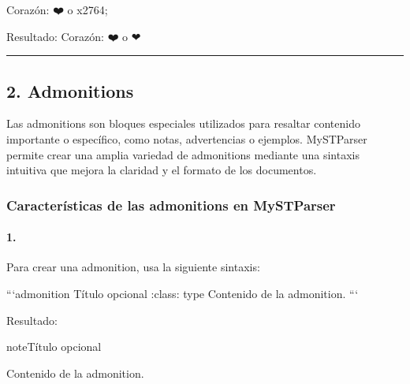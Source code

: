 \documentclass[a4paper,10pt,oneside,spanish,openany]{sphinxmanual}
\begin{document}
\begin{sphinxVerbatim}[commandchars=\\\{\}]
Corazón: ❤️ o \PYGZam{}\PYGZsh{}x2764;
\end{sphinxVerbatim}

\sphinxAtStartPar
Resultado: Corazón: ❤️ o ❤


\bigskip\hrule\bigskip



\subsection{2. Admonitions}
\label{\detokenize{configuracion_inicial/013.guia_de_myst_parser:admonitions}}
\sphinxAtStartPar
Las admonitions son bloques especiales utilizados para resaltar contenido importante o específico, como notas, advertencias o ejemplos. MyST\sphinxhyphen{}Parser permite crear una amplia variedad de admonitions mediante una sintaxis intuitiva que mejora la claridad y el formato de los documentos.


\subsubsection{Características de las admonitions en MyST\sphinxhyphen{}Parser}
\label{\detokenize{configuracion_inicial/013.guia_de_myst_parser:caracteristicas-de-las-admonitions-en-myst-parser}}

\paragraph{1. }
\label{\detokenize{configuracion_inicial/013.guia_de_myst_parser:sintaxis-basica}}
\sphinxAtStartPar
Para crear una admonition, usa la siguiente sintaxis:

\begin{sphinxVerbatim}[commandchars=\\\{\}]
    ```\PYGZob{}admonition\PYGZcb{} Título opcional :class: type Contenido de la admonition. ```
\end{sphinxVerbatim}

\sphinxAtStartPar
Resultado:

\begin{sphinxadmonition}{note}{Título opcional}

\sphinxAtStartPar
Contenido de la admonition.
\end{sphinxadmonition}
\end{document}
